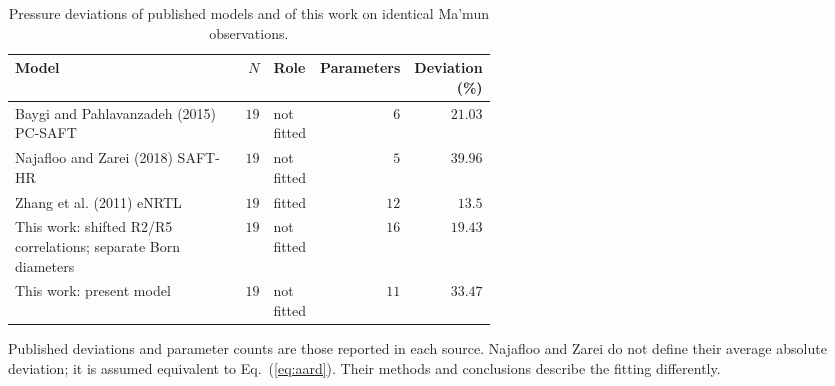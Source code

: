 \begin{table}[pos=!htbp]\small\setlength{\tabcolsep}{3pt}\centering
\caption{Pressure deviations of published models and of this work on identical Ma'mun observations.}\label{tab:matched-pressure}
\begin{tabular}{@{}>{\raggedright\arraybackslash}p{0.5600\linewidth}rlrr@{}}
\toprule
Model & $N$ & Role & Parameters & Deviation (\%) \\
\midrule
Baygi and Pahlavanzadeh (2015) PC-SAFT & $19$ & not fitted & $6$ & $21.03$ \\
Najafloo and Zarei (2018) SAFT-HR & $19$ & not fitted & $5$ & $39.96$ \\
Zhang et al. (2011) eNRTL & $19$ & fitted & $12$ & $13.5$ \\
This work: shifted R2/\allowbreak{}R5 correlations; separate Born diameters & $19$ & not fitted & $16$ & $19.43$ \\
This work: present model & $19$ & not fitted & $11$ & $33.47$ \\
\bottomrule
\end{tabular}
\par\smallskip\parbox{\linewidth}{\footnotesize\raggedright Published deviations and parameter counts are those reported in each source. Najafloo and Zarei do not define their average absolute deviation; it is assumed equivalent to Eq.~(\ref{eq:aard}). Their methods and conclusions describe the fitting differently.}
\end{table}
